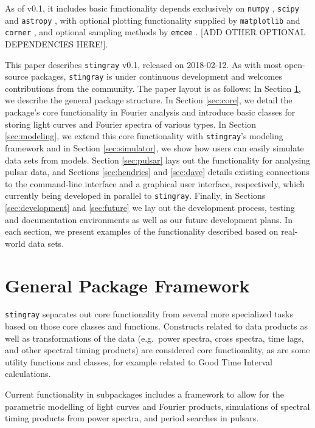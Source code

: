 \documentclass[12pt]{emulateapj}
\newcommand{\stingray}{\texttt{stingray}\xspace}
\begin{document}
As of v0.1, it includes basic functionality depends exclusively on \texttt{numpy} \citep{numpy}, \texttt{scipy} \citep{scipy} and \texttt{astropy} \citep{astropy}, with optional plotting functionality supplied by \texttt{matplotlib} \citep{matplotlib} and \texttt{corner} \citep{corner}, and optional sampling methods by \texttt{emcee} \citep{emcee}. [ADD OTHER OPTIONAL DEPENDENCIES HERE!].

This paper describes \stingray v0.1, released on 2018-02-12. 
As with most open-source packages, \stingray is under continuous development and welcomes contributions from the community.
The paper layout is as follows: 
In Section \ref{sec:general_package}, we describe the general package structure. 
In Section \ref{sec:core}, we detail the package's core functionality in Fourier analysis and introduce basic classes for storing light curves and Fourier spectra of various types. 
In Section \ref{sec:modeling}, we extend this core functionality with \stingray's modeling framework and in Section \ref{sec:simulator}, we show how users can easily simulate data sets from models. 
Section \ref{sec:pulsar} lays out the functionality for analysing pulsar data, and Sections \ref{sec:hendrics} and \ref{sec:dave} details existing connections to the command-line interface and a graphical user interface, respectively, which currently being developed in parallel to \stingray. 
Finally, in Sections \ref{sec:development} and \ref{sec:future} we lay out the development process, testing and documentation environments as well as our future development plans. 
In each section, we present examples of the functionality described based on real-world data sets.

\section{General Package Framework}
\label{sec:general_package}

\stingray separates out core functionality from several more specialized tasks based on those core classes and functions. Constructs related to data products as well as transformations of the data (e.g.\ power spectra, cross spectra, time lags, and other spectral timing products) are considered core functionality, as are some utility functions and classes, for example related to Good Time Interval calculations. 

Current functionality in subpackages includes a framework to allow for the parametric modelling of light curves and Fourier products, simulations of spectral timing products from power spectra, and period searches in pulsars.
\end{document}
